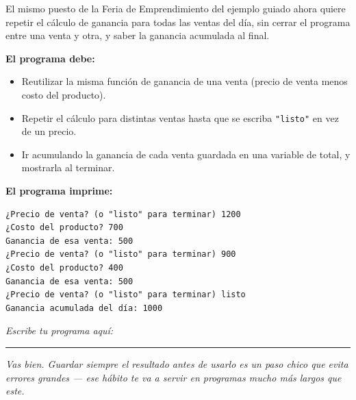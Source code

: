 \documentclass[11pt]{article}
\begin{document}
El mismo puesto de la Feria de Emprendimiento del ejemplo guiado ahora quiere repetir el cálculo de ganancia para todas las ventas del día, sin cerrar el programa entre una venta y otra, y saber la ganancia acumulada al final.

\textbf{El programa debe:}
\begin{itemize}
  \item Reutilizar la misma función de ganancia de una venta (precio de venta menos costo del producto).
  \item Repetir el cálculo para distintas ventas hasta que se escriba \texttt{"listo"} en vez de un precio.
  \item Ir acumulando la ganancia de cada venta guardada en una variable de total, y mostrarla al terminar.
\end{itemize}
\vspace{1mm}\textbf{El programa imprime:}
\begin{cajacodigo}
\begin{Verbatim}[fontsize=\small]
¿Precio de venta? (o "listo" para terminar) 1200
¿Costo del producto? 700
Ganancia de esa venta: 500
¿Precio de venta? (o "listo" para terminar) 900
¿Costo del producto? 400
Ganancia de esa venta: 500
¿Precio de venta? (o "listo" para terminar) listo
Ganancia acumulada del día: 1000
\end{Verbatim}
\end{cajacodigo}
\vspace{2mm}\textit{Escribe tu programa aquí:}\vspace{1mm}

\begin{cajaescribe}[height=6.5cm]
\end{cajaescribe}

\vspace{1cm}
\begin{center}
\rule{0.6\textwidth}{0.4pt}

\vspace{4mm}
\textit{Vas bien. Guardar siempre el resultado antes de usarlo es un paso chico que evita errores grandes --- ese hábito te va a servir en programas mucho más largos que este.}
\end{center}
\end{document}
